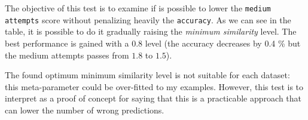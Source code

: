 
The objective of this test is to examine if is possible to lower the \texttt{medium attempts} score without penalizing heavily the \texttt{accuracy}. As we can see in the table, it is possible to do it gradually raising the \textit{minimum similarity} level. The best performance is gained with a $0.8$ level (the accuracy decreases by 0.4 \% but the medium attempts passes from $1.8$ to $1.5$).

The found optimum minimum similarity level is not suitable for each dataset: this meta-parameter could be over-fitted to my examples. However, this test is to interpret as a proof of concept for saying that this is a practicable approach that can lower the number of wrong predictions.

